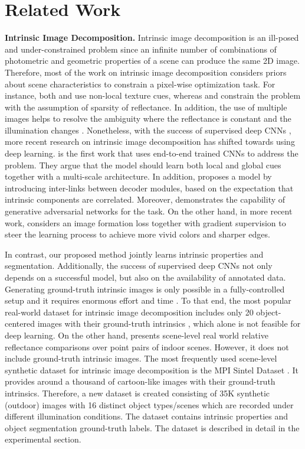 \documentclass[runningheads]{llncs}
\begin{document}
\section{Related Work}
\textbf{Intrinsic Image Decomposition.} 
Intrinsic image decomposition is an ill-posed and under-constrained problem since an infinite number of combinations of photometric and geometric properties of a scene can produce the same 2D image. Therefore, most of the work on intrinsic image decomposition considers priors about scene characteristics to constrain a pixel-wise optimization task. For instance, both \cite{shen} and \cite{zhao} use non-local texture cues, whereas \cite{gehler} and \cite{shen2} constrain the problem with the assumption of sparsity of reflectance. In addition, the use of multiple images helps to resolve the ambiguity where the reflectance is constant and the illumination changes \cite{weiss,matsushita}. Nonetheless, with the success of supervised deep CNNs \cite{vggnet,rcnn}, more recent research on intrinsic image decomposition has shifted towards using deep learning. \cite{narihia} is the first work that uses end-to-end trained CNNs to address the problem. They argue that the model should learn both local and global cues together with a multi-scale architecture. In addition, \cite{shi} proposes a model by introducing inter-links between decoder modules, based on the expectation that intrinsic components are correlated. Moreover, \cite{lettry} demonstrates the capability of generative adversarial networks for the task. On the other hand, in more recent work, \cite{baslamisli} considers an image formation loss together with gradient supervision to steer the learning process to achieve more vivid colors and sharper edges. 

In contrast, our proposed method jointly learns intrinsic properties and segmentation. Additionally, the success of supervised deep CNNs not only depends on a successful model, but also on the availability of annotated data. Generating ground-truth intrinsic images is only possible in a fully-controlled setup and it requires enormous effort and time \cite{mit}. To that end, the most popular real-world dataset for intrinsic image decomposition includes only 20 object-centered images with their ground-truth intrinsics \cite{mit}, which alone is not feasible for deep learning. On the other hand, \cite{iiw} presents scene-level real world relative reflectance comparisons over point pairs of indoor scenes. However, it does not include ground-truth intrinsic images. The most frequently used scene-level synthetic dataset for intrinsic image decomposition is the MPI Sintel Dataset \cite{sintel}. It provides around a thousand of cartoon-like images with their ground-truth intrinsics. 
Therefore, a new dataset is created consisting of 35K synthetic (outdoor) images with 16 distinct object types/scenes which are recorded under different illumination conditions. The dataset contains intrinsic properties and object segmentation ground-truth labels. The dataset is described in detail in the experimental section.
\end{document}
